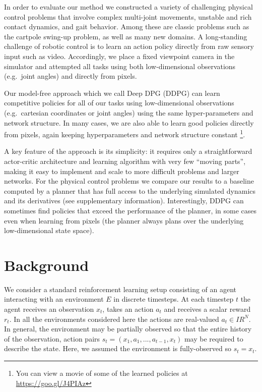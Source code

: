 \documentclass{article} %
\newcommand{\RR}{I\!\!R} %
\begin{document}


In order to evaluate our method we constructed a variety of challenging physical control problems
that involve complex multi-joint movements, unstable and rich contact
dynamics, and gait behavior.  Among these are classic
problems such as the cartpole swing-up problem, as well as many new
domains.
A long-standing
challenge of robotic control is to learn an action policy directly from raw
sensory input such as video. Accordingly, we place a fixed viewpoint
camera in the simulator and attempted all tasks
using both low-dimensional observations (e.g.\ joint angles)
and directly from pixels.


Our model-free approach which we call
Deep DPG (DDPG) can learn competitive policies for
all of our tasks
using low-dimensional observations
(e.g.\ cartesian coordinates or
joint angles) using the same hyper-parameters and
network structure.
In many cases, we are also able to learn good policies directly
from pixels, again keeping hyperparameters and
network structure constant \footnote{You can view a movie of some
of the learned policies at \url{https://goo.gl/J4PIAz}}.

A key feature of the approach is its simplicity: it requires
only a straightforward actor-critic architecture and learning
algorithm with very few ``moving parts'', making it easy to implement and
scale to more difficult problems and larger networks.  For the
physical control problems we compare our results to a baseline
computed by a planner \citep{tassa2012synthesis} that has full access
to the underlying simulated dynamics and its derivatives (see
supplementary information).  Interestingly, DDPG can sometimes find
policies that exceed the performance of the planner, in some cases
even when learning from pixels (the planner always plans over the
underlying low-dimensional state space).


\section{Background}

We consider a standard reinforcement learning setup consisting of an
agent interacting with an environment $E$ in discrete timesteps. At
each timestep $t$ the agent receives an observation $x_t$,
takes an action $a_t $ and receives a scalar reward $r_t$.
In all the environments considered here the actions are real-valued
$a_t \in \RR^N $.
In general, the environment may be
partially observed so that the entire history of the observation, action
pairs $ s_t = (x_1, a_1, ... , a_{t-1}, x_t) $
may be required to describe the state. Here, we
assumed the environment is fully-observed so
 $s_t = x_t$.
\end{document}
